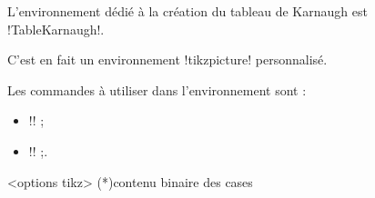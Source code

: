 \documentclass[french,a4paper,11pt]{article}
\begin{document}
\begin{cautionblock}
L'environnement dédié à la création du tableau de Karnaugh est \motcletex!TableKarnaugh!.

C'est en fait un environnement \motcletex!tikzpicture! personnalisé.

\smallskip

Les commandes à utiliser dans l'environnement sont :

\begin{itemize}
	\item \motcletex!\KarnaughCasesResult! ;
	\item \motcletex!\KarnaughBlocRegroup! ;.
\end{itemize}
\vspace*{-\baselineskip}\leavevmode
\end{cautionblock}

\begin{DemoCode}
\begin{TableKarnaugh}[clés]<options tikz>
	\KarnaughCasesResult(*){contenu binaire des cases}
\end{TableKarnaugh}
\end{DemoCode}
%

\begin{DemoCode}[]
\begin{TableKarnaugh}[Aide]
\end{TableKarnaugh}
\hspace{0.5cm}
\begin{TableKarnaugh}[Variables=u/v/w]
\end{TableKarnaugh}
\hspace{0.5cm}
\begin{TableKarnaugh}[Variables=u/v/w,Swap]
\end{TableKarnaugh}

\begin{center}
	\begin{TableKarnaugh}[Legende=false,Unite=1.5cm,Epaisseur=1.5pt,Couleur=brown]
	\end{TableKarnaugh}
\end{center}
\end{DemoCode}
\end{document}
